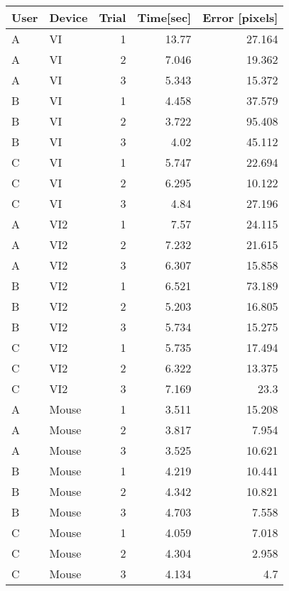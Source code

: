 \begin{tabular}{llrrr}
 \toprule
 User & Device & Trial & Time[sec] & Error [pixels] \\
 \midrule
A	&	VI	&	1	&	13.77	&	27.164	\\
A	&	VI	&	2	&	7.046	&	19.362	\\
A	&	VI	&	3	&	5.343	&	15.372	\\
B	&	VI	&	1	&	4.458	&	37.579	\\
B	&	VI	&	2	&	3.722	&	95.408	\\
B	&	VI	&	3	&	4.02	&	45.112	\\
C	&	VI	&	1	&	5.747	&	22.694	\\
C	&	VI	&	2	&	6.295	&	10.122	\\
C	&	VI	&	3	&	4.84	&	27.196	\\
A	&	VI2	&	1	&	7.57	&	24.115	\\
A	&	VI2	&	2	&	7.232	&	21.615	\\
A	&	VI2	&	3	&	6.307	&	15.858	\\
B	&	VI2	&	1	&	6.521	&	73.189	\\
B	&	VI2	&	2	&	5.203	&	16.805	\\
B	&	VI2	&	3	&	5.734	&	15.275	\\
C	&	VI2	&	1	&	5.735	&	17.494	\\
C	&	VI2	&	2	&	6.322	&	13.375	\\
C	&	VI2	&	3	&	7.169	&	23.3	\\
A	&	Mouse	&	1	&	3.511	&	15.208	\\
A	&	Mouse	&	2	&	3.817	&	7.954	\\
A	&	Mouse	&	3	&	3.525	&	10.621	\\
B	&	Mouse	&	1	&	4.219	&	10.441	\\
B	&	Mouse	&	2	&	4.342	&	10.821	\\
B	&	Mouse	&	3	&	4.703	&	7.558	\\
C	&	Mouse	&	1	&	4.059	&	7.018	\\
C	&	Mouse	&	2	&	4.304	&	2.958	\\
C	&	Mouse	&	3	&	4.134	&	4.7	\\
 \bottomrule
\end{tabular}
